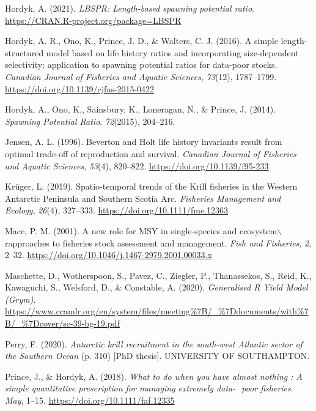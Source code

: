 \documentclass[
]{article}
\newlength{\cslhangindent}
\newlength{\cslentryspacingunit} %
\newenvironment{CSLReferences}[2] %
 {%
  \setlength{\parindent}{0pt}
  \ifodd #1
  \let\oldpar\par
  \def\par{\hangindent=\cslhangindent\oldpar}
  \fi
  \setlength{\parskip}{#2\cslentryspacingunit}
 }%
 {}
\begin{document}
\begin{CSLReferences}{1}{0}
\leavevmode{}%
Hordyk, A. (2021). \emph{LBSPR: Length-based spawning potential ratio}.
\url{https://CRAN.R-project.org/package=LBSPR}

\leavevmode{}%
Hordyk, A. R., Ono, K., Prince, J. D., \& Walters, C. J. (2016). {A
simple length-structured model based on life history ratios and
incorporating size-dependent selectivity: application to spawning
potential ratios for data-poor stocks}. \emph{Canadian Journal of
Fisheries and Aquatic Sciences}, \emph{73}(12), 1787--1799.
\url{https://doi.org/10.1139/cjfas-2015-0422}

\leavevmode{}%
Hordyk, A., Ono, K., Sainsbury, K., Loneragan, N., \& Prince, J. (2014).
\emph{{Spawning Potential Ratio}}. \emph{72}(2015), 204--216.

\leavevmode{}%
Jensen, A. L. (1996). {Beverton and Holt life history invariants result
from optimal trade-off of reproduction and survival}. \emph{Canadian
Journal of Fisheries and Aquatic Sciences}, \emph{53}(4), 820--822.
\url{https://doi.org/10.1139/f95-233}

\leavevmode{}%
Krüger, L. (2019). {Spatio-temporal trends of the Krill fisheries in the
Western Antarctic Peninsula and Southern Scotia Arc}. \emph{Fisheries
Management and Ecology}, \emph{26}(4), 327--333.
\url{https://doi.org/10.1111/fme.12363}

\leavevmode{}%
Mace, P. M. (2001). {A new role for MSY in single-species and
ecosystem\(\backslash\)rapproaches to fisheries stock assessment and
management}. \emph{Fish and Fisheries}, \emph{2}, 2--32.
\url{https://doi.org/10.1046/j.1467-2979.2001.00033.x}

\leavevmode{}%
Maschette, D., Wotherspoon, S., Pavez, C., Ziegler, P., Thanassekos, S.,
Reid, K., Kawaguchi, S., Welsford, D., \& Constable, A. (2020).
\emph{{Generalised R Yield Model (Grym)}}.
\url{https://www.ccamlr.org/en/system/files/meeting\%7B/_\%7Ddocuments/with\%7B/_\%7Dcover/sc-39-bg-19.pdf}

\leavevmode{}%
Perry, F. (2020). \emph{{Antarctic krill recruitment in the south-west
Atlantic sector of the Southern Ocean}} (p. 310) {[}PhD thesis{]}.
UNIVERSITY OF SOUTHAMPTON.

\leavevmode{}%
Prince, J., \& Hordyk, A. (2018). \emph{{What to do when you have almost
nothing : A simple quantitative prescription for managing extremely
data- ­ poor fisheries}}. \emph{May}, 1--15.
\url{https://doi.org/10.1111/faf.12335}


\end{CSLReferences}
\end{document}
